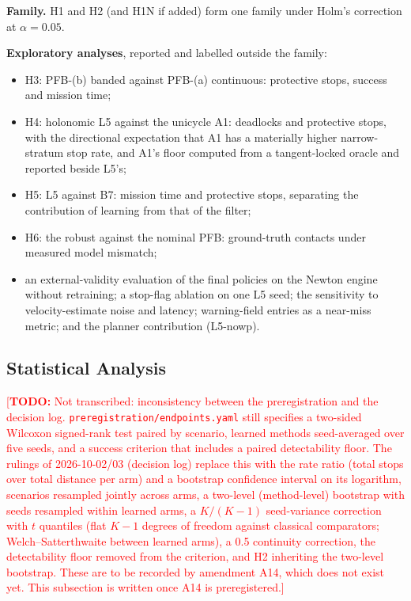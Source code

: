\documentclass[sensors,article,submit,moreauthors]{Definitions/mdpi}
\newcommand{\todo}[1]{\textcolor{red}{[\textbf{TODO:} #1]}}
\begin{document}
\textbf{Family.} H1 and H2 (and H1N if added) form one family under Holm's correction at $\alpha = 0.05$.

\textbf{Exploratory analyses}, reported and labelled outside the family:
\begin{itemize}
\item H3: PFB-(b) banded against PFB-(a) continuous: protective stops, success and mission time;
\item H4: holonomic L5 against the unicycle A1: deadlocks and protective stops, with the directional expectation that A1 has a materially higher narrow-stratum stop rate, and A1's floor computed from a tangent-locked oracle and reported beside L5's;
\item H5: L5 against B7: mission time and protective stops, separating the contribution of learning from that of the filter;
\item H6: the robust against the nominal PFB: ground-truth contacts under measured model mismatch;
\item an external-validity evaluation of the final policies on the Newton engine without retraining; a stop-flag ablation on one L5 seed; the sensitivity to velocity-estimate noise and latency; warning-field entries as a near-miss metric; and the planner contribution (L5-nowp).
\end{itemize}

\subsection{Statistical Analysis}\label{sec:stats}

\todo{Not transcribed: inconsistency between the preregistration and the decision log. \texttt{preregistration/endpoints.yaml} still specifies a two-sided Wilcoxon signed-rank test paired by scenario, learned methods seed-averaged over five seeds, and a success criterion that includes a paired detectability floor. The rulings of 2026-10-02/03 (decision log) replace this with the rate ratio (total stops over total distance per arm) and a bootstrap confidence interval on its logarithm, scenarios resampled jointly across arms, a two-level (method-level) bootstrap with seeds resampled within learned arms, a $K/(K-1)$ seed-variance correction with $t$ quantiles (flat $K-1$ degrees of freedom against classical comparators; Welch--Satterthwaite between learned arms), a 0.5 continuity correction, the detectability floor removed from the criterion, and H2 inheriting the two-level bootstrap. These are to be recorded by amendment A14, which does not exist yet. This subsection is written once A14 is preregistered.}
\end{document}
